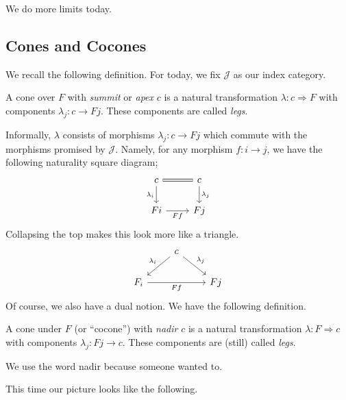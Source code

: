 
We do more limits today.

\subsection{Cones and Cocones}
We recall the following definition. For today, we fix $\mathcal J$ as our index category.
\conedef*
\begin{definition}[Apex]
	A cone over $F$ with \textit{summit} or \textit{apex} $c$ is a natural transformation $\lambda:c\Rightarrow F$ with components $\lambda_j:c\to Fj$. These components are called \textit{legs}.
\end{definition}
Informally, $\lambda$ consists of morphisms $\lambda_j:c\to Fj$ which commute with the morphisms promised by $\mathcal J$. Namely, for any morphism $f:i\to j$, we have the following naturality square diagram;
\[\begin{tikzcd}
	c & c \\
	Fi & Fj
	\arrow["Ff"', from=2-1, to=2-2]
	\arrow[Rightarrow, no head, from=1-1, to=1-2]
	\arrow["{\lambda_i}"', from=1-1, to=2-1]
	\arrow["{\lambda_j}", from=1-2, to=2-2]
\end{tikzcd}\]
Collapsing the top makes this look more like a triangle.
\[\begin{tikzcd}
	& c \\
	{F_i} && Fj
	\arrow["{\lambda_j}", from=1-2, to=2-3]
	\arrow["{\lambda_i}"', from=1-2, to=2-1]
	\arrow["Ff"', from=2-1, to=2-3]
\end{tikzcd}\]
Of course, we also have a dual notion. We have the following definition.
\begin{definition}[Nadir]
	A cone under $F$ (or ``cocone'') with \textit{nadir} $c$ is a natural transformation $\lambda:F\Rightarrow c$ with components $\lambda_j:Fj\to c$. These components are (still) called \textit{legs}.
\end{definition}
\begin{remark}
	We use the word nadir because someone wanted to.
\end{remark}
This time our picture looks like the following.

